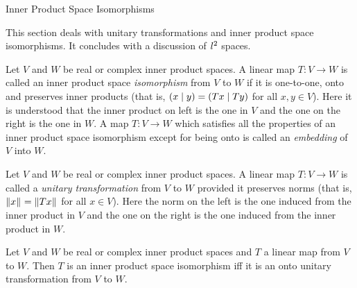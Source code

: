 \begin{section}{Inner Product Space Isomorphisms}

	This section deals with unitary transformations
	and inner product space isomorphisms. It concludes
	with a discussion of $\ltwo$ spaces.
	

\begin{defn}
	Let $V$ and $W$ be real or complex inner product spaces. A
	linear map $T:V \rightarrow W$ is called an inner
	product space \emph{isomorphism} from $V$ to $W$ if it is
	one-to-one, onto and preserves inner products (that is,
	$\innrprod{x}{y}=\innrprod{Tx}{Ty}$ for all $x,y \in V$).
	Here it is understood that the inner product on left is
	the one in $V$ and the one on the right is the one in $W$.
	A map $T:V \rightarrow W$ which satisfies all the properties
	of an inner product space isomorphism except for being
	onto is called an \emph{embedding} of $V$ into $W$.
\end{defn}
	

\begin{defn}
	Let $V$ and $W$ be real or complex inner product spaces. A
	linear map $T:V \rightarrow W$ is called a \emph{unitary
	transformation} from $V$ to $W$ provided it preserves norms
	(that is, $\norm[]{x}=\norm[]{Tx}$ for all $x \in V$). Here
	the norm on the left is the one induced from the inner product
	in $V$ and the one on the right is the one induced from the
	inner product in $W$.
\end{defn}
	

\begin{thrm}\label{thrm:Unitary}
	Let $V$ and $W$ be real or complex inner product spaces
	and $T$ a linear map from $V$ to $W$. Then $T$ is an 
	inner product space isomorphism
	iff it is an onto unitary transformation from $V$ to $W$.
\end{thrm}


\end{section}
